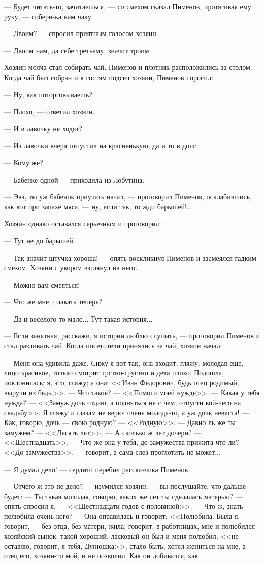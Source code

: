 --- Будет читать-то, зачитаешься, --- со смехом сказал Пименов, протягивая ему руку, --- собери-ка нам чаку.

--- Двоим? --- спросил приятным голосом хозяин.

--- Двоим нам, да себе третьему, значит троим.

Хозяин молча стал собирать чай. Пименов и плотник расположились за столом. Когда чай был собран и к гостям подсел хозяин, Пименов спросил:

--- Ну, как поторговываешь?

--- Плохо, --- ответил хозяин.

--- И в лавочку не ходят?

--- Из лавочки вчера отпустил на красненькую, да и то в долг.

--- Кому же?

--- Бабенке одной --- приходила из Лобутина.

--- Эва, ты уж бабенок приучать начал, --- проговорил Пименов, осклабившись, как кот при запахе мяса, --- ну, если так, то жди барышей!..

Хозяин однако оставался серьезным и проговорил:

--- Тут не до барышей.

--- Так значит штучка хороша! --- опять воскликнул Пименов и засмеялся гадким смехом. Хозяин с укором взглянул на него.

--- Можно вам смеяться!

--- Что же мне, плакать теперь?

--- Да и веселого-то мало... Тут такая история...

--- Если занятная, расскажи, я истории люблю слушать, --- проговорил Пименов и стал разливать чай. Когда посетители принялись за чай, хозяин начал:

--- Меня она удивила даже. Сижу я вот так, она входит, гляжу: молодая еще, лицо красивое, только смотрит грстно-грустно и дета плохо. Подошла, поклонилась; я, это, гляжу; а она: <<Иван Федорович, будь отец родимый, выручи из беды>>. --- Что такое? --- <<Помоги моей нужде>>. --- Какая у тебя нужда? --- <<Замуж дочь отдаю, а подняться не с чем, отпусти кой-чего на свадьбу>>. Я гляжу и глазам не верю: очень молода-то, а уж дочь невеста! --- Как, говорю, дочь --- свою родную? --- <<Родную>>. --- Давно ль же ты замужем? --- <<Десять лет>>. --- А сколько ж лет дочери? --- <<Шестнадцать>>. --- Что же она у тебя, до замужества прижита что ли? --- <<До замужества>>, --- говорит, а сама слез проглотить не может...

--- Я думал дело! --- сердито перебил рассказчика Пименов.

--- Отчего ж это не дело? --- изумился хозяин, --- вы послушайте, что дальше будет: --- Ты такая молодая, говорю, каких же лет ты сделалась матерью? --- опять спросил я. --- <<Шестнадцати годов с половиной>>. --- Что ж, знать полюбила очень кого? --- Она оправилась и говорит: <<Полюбила. Была я, --- говорит, --- без отца, без матери, жила, говорит, в работницах, мне и полюбился хозяйский сынок; такой хороший, ласковый он был и меня полюбил; <<не оставлю, говорит, я тебя, Дунюшка>>, стало быть, хотел жениться на мне, а отец его, хозяин-то мой, и не позволил. Как он добивался, как
